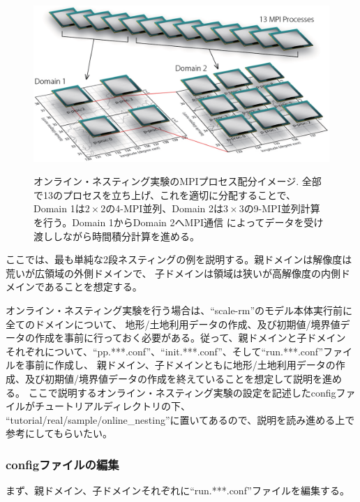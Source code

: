 \begin{figure}[t]
\begin{center}
  \includegraphics[width=0.8\hsize]{./figure/mpisplit_nesting.eps}\\
  \caption{オンライン・ネスティング実験のMPIプロセス配分イメージ. 全部で13のプロセスを立ち上げ、これを適切に分配することで、
           Domain 1は$2 \times 2$の4-MPI並列、Domain 2は$3 \times 3$の9-MPI並列計算を行う。Domain 1からDomain 2へMPI通信
           によってデータを受け渡ししながら時間積分計算を進める。}
  \label{fig_mpisplit}
\end{center}
\end{figure}


ここでは、最も単純な2段ネスティングの例を説明する。親ドメインは解像度は荒いが広領域の外側ドメインで、
子ドメインは領域は狭いが高解像度の内側ドメインであることを想定する。

オンライン・ネスティング実験を行う場合は、``scale-rm''のモデル本体実行前に全てのドメインについて、
地形/土地利用データの作成、及び初期値/境界値データの作成を事前に行っておく必要がある。従って、親ドメインと子ドメイン
それぞれについて、``pp.***.conf''、``init.***.conf''、そして``run.***.conf''ファイルを事前に作成し、
親ドメイン、子ドメインともに地形/土地利用データの作成、及び初期値/境界値データの作成を終えていることを想定して説明を進める。
ここで説明するオンライン・ネスティング実験の設定を記述したconfigファイルがチュートリアルディレクトリの下、
``tutorial/real/sample/online\_nesting''に置いてあるので、説明を読み進める上で参考にしてもらいたい。


\subsubsection{configファイルの編集}
まず、親ドメイン、子ドメインそれぞれに``run.***.conf''ファイルを編集する。

